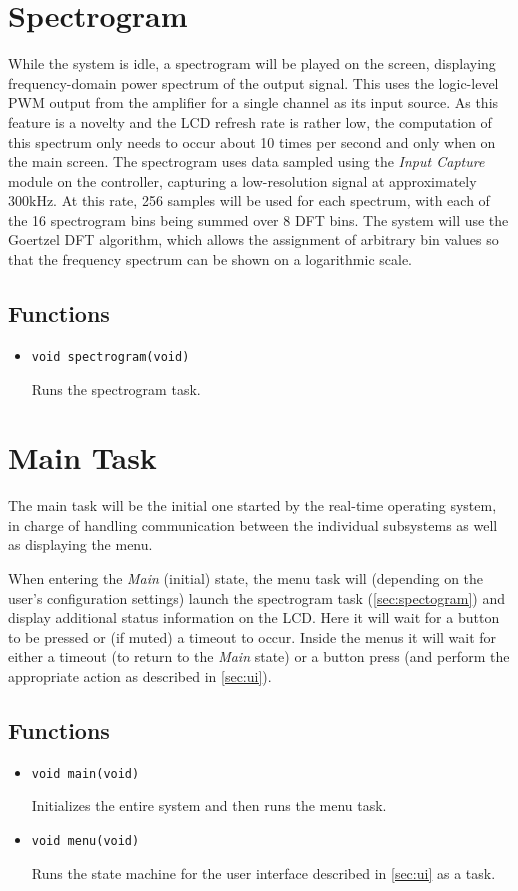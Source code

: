 \section{Spectrogram}
\label{sec:spectrogram}
While the system is idle, a spectrogram will be played on the screen, displaying frequency-domain power spectrum of the output signal. This uses the logic-level PWM output from the amplifier for a single channel as its input source. As this feature is a novelty and the LCD refresh rate is rather low, the computation of this spectrum only needs to occur about 10 times per second and only when on the main screen. The spectrogram uses data sampled using the \emph{Input Capture} module on the controller, capturing a low-resolution signal at approximately 300kHz. At this rate, 256 samples will be used for each spectrum, with each of the 16 spectrogram bins being summed over 8 DFT bins. The system will use the Goertzel DFT algorithm, which allows the assignment of arbitrary bin values so that the frequency spectrum can be shown on a logarithmic scale.  

\subsection*{Functions}
\begin{itemize}
\item \verb|void spectrogram(void)|

Runs the spectrogram task.
\end{itemize}

\section{Main Task}

The main task will be the initial one started by the real-time operating system, in charge of handling communication between the individual subsystems as well as displaying the menu.

When entering the \emph{Main} (initial) state, the menu task will (depending on the user's configuration settings) launch the spectrogram task (\autoref{sec:spectogram}) and display additional status information on the LCD. Here it will wait for a button to be pressed or (if muted) a timeout to occur. Inside the menus it will wait for either a timeout (to return to the \emph{Main} state) or a button press (and perform the appropriate action as described in \autoref{sec:ui}).

\subsection*{Functions}
\begin{itemize}
\item \verb|void main(void)|

Initializes the entire system and then runs the menu task.

\item \verb|void menu(void)|

Runs the state machine for the user interface described in \autoref{sec:ui} as a task.
\end{itemize}
